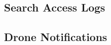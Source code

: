 \documentclass{article}
\begin{document}
\subsection{Search Access Logs}
\noindent{}

\subsection{Drone Notifications}
\noindent{}
\end{document}
